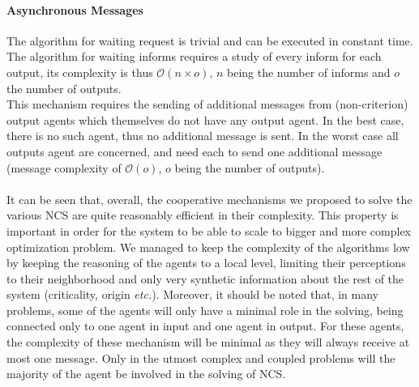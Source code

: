 \paragraph*{Asynchronous Messages}

The algorithm for waiting request is trivial and can be executed in constant time. The algorithm for waiting informs requires a study of every inform for each output, its complexity is thus $\mathcal{O}(n \times o)$, $n$ being the number of informs and $o$ the number of outputs.\\
This mechanism requires the sending of additional messages from (non-criterion) output agents which themselves do not have any output agent. In the best case, there is no such agent, thus no additional message is sent. In the worst case all outputs agent are concerned, and need each to send one additional message (message complexity of $\mathcal{O}(o)$, $o$ being the number of outputs).

\paragraph*{}
It can be seen that, overall, the cooperative mechanisms we proposed to solve the various NCS are quite reasonably efficient in their complexity. This property is important in order for the system to be able to scale to bigger and more complex optimization problem. We managed to keep the complexity of the algorithms low by keeping the reasoning of the agents to a local level, limiting their perceptions to their neighborhood and only very synthetic information about the rest of the system (criticality, origin \emph{etc.}). Moreover, it should be noted that, in many problems, some of the agents will only have a minimal role in the solving, being connected only to one agent in input and one agent in output. For these agents, the complexity of these mechanism will be minimal as they will always receive at most one message. Only in the utmost complex and coupled problems will the majority of the agent be involved in the solving of NCS.

